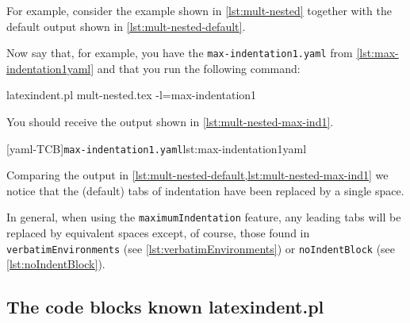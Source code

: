 \documentclass[10pt]{article}
\begin{document}
 \begin{example}
 For example, consider the example shown in \cref{lst:mult-nested} together with the
 default output shown in \cref{lst:mult-nested-default}.

 \begin{cmhtcbraster}[raster column skip=.1\linewidth]
 \end{cmhtcbraster}
 \end{example}

 \begin{example}
 Now say that, for example, you have the \texttt{max-indentation1.yaml} from
 \cref{lst:max-indentation1yaml} and that you run the following command:

 \begin{commandshell}
latexindent.pl mult-nested.tex -l=max-indentation1
\end{commandshell}

 You should receive the output shown in \cref{lst:mult-nested-max-ind1}.

 \begin{cmhtcbraster}
  [yaml-TCB]{\texttt{max-indentation1.yaml}}{lst:max-indentation1yaml}
 \end{cmhtcbraster}
 \end{example}

 Comparing the output in \cref{lst:mult-nested-default,lst:mult-nested-max-ind1} we
 notice that the (default) tabs of indentation have been replaced by a single space.

 In general, when using the \texttt{maximumIndentation} feature, any leading tabs will be
 replaced by equivalent spaces except, of course, those found in
 \texttt{verbatimEnvironments} (see \vref{lst:verbatimEnvironments}) or
 \texttt{noIndentBlock} (see \vref{lst:noIndentBlock}).

\subsection{The code blocks known latexindent.pl}\label{subsubsec:code-blocks}
\end{document}
